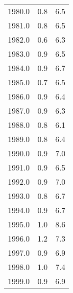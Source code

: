 \begin{tabular}{ccc}
\hline
1980.0 & 0.8 & 6.5 \\
1981.0 & 0.8 & 6.5 \\
1982.0 & 0.6 & 6.3 \\
1983.0 & 0.9 & 6.5 \\
1984.0 & 0.9 & 6.7 \\
1985.0 & 0.7 & 6.5 \\
1986.0 & 0.9 & 6.4 \\
1987.0 & 0.9 & 6.3 \\
1988.0 & 0.8 & 6.1 \\
1989.0 & 0.8 & 6.4 \\
1990.0 & 0.9 & 7.0 \\
1991.0 & 0.9 & 6.5 \\
1992.0 & 0.9 & 7.0 \\
1993.0 & 0.8 & 6.7 \\
1994.0 & 0.9 & 6.7 \\
1995.0 & 1.0 & 8.6 \\
1996.0 & 1.2 & 7.3 \\
1997.0 & 0.9 & 6.9 \\
1998.0 & 1.0 & 7.4 \\
1999.0 & 0.9 & 6.9 \\
\hline
\end{tabular}
